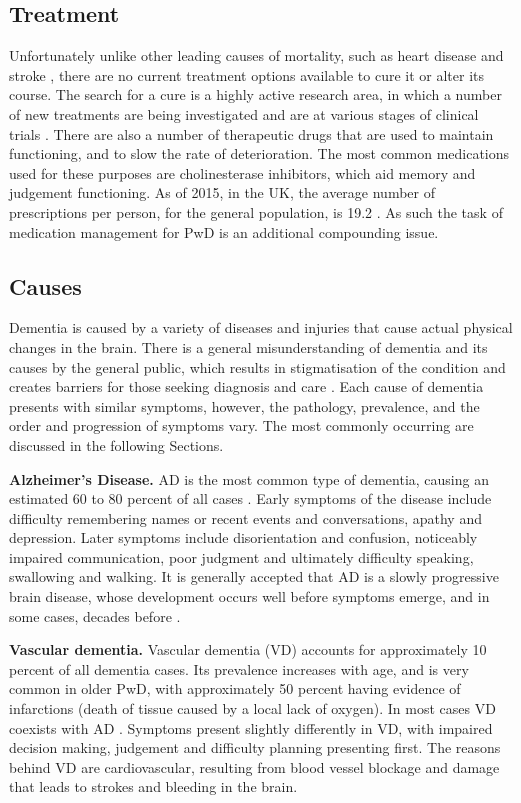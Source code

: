 \subsection{Treatment}
Unfortunately unlike other leading causes of mortality, such as heart disease and stroke \cite{WorldHealthOrganisation2015}, there are no current treatment options available to cure it or alter its course.
The search for a cure is a highly active research area, in which a number of new treatments are being investigated and are at various stages of clinical trials \cite{Burke2015}. There are also a number of therapeutic drugs that are used to maintain functioning, and to slow the rate of deterioration. The most common medications used for these purposes are cholinesterase inhibitors, which aid memory and judgement functioning. As of 2015, in the UK, the average number of prescriptions per person, for the general population, is 19.2 \cite{TheAssociationoftheBritishPharmaceuticalIndustry}. As such the task of medication management for PwD is an additional compounding issue.

\subsection{Causes}
Dementia is caused by a variety of diseases and injuries that cause actual physical changes in the brain. There is a general misunderstanding of dementia and its causes by the general public, which results in stigmatisation of the condition and creates barriers for those seeking diagnosis and care \cite{WHODementia2015}.
Each cause of dementia presents with similar symptoms, however, the pathology, prevalence, and the order and progression of symptoms vary. The most commonly occurring are discussed in the following Sections.

\textbf{Alzheimer's Disease.}
AD is the most common type of dementia, causing an estimated 60 to 80 percent of all cases \cite{2015AlzheimersDiseaseFactsFigures}.
Early symptoms of the disease include difficulty remembering names or recent events and conversations, apathy and depression. Later symptoms include disorientation and confusion, noticeably impaired communication, poor judgment and ultimately difficulty speaking, swallowing and walking.
It is generally accepted that AD is a slowly progressive brain disease, whose development occurs well before symptoms emerge, and in some cases, decades before \cite{DelaTorre2012, 2015AlzheimersDiseaseFactsFigures}.

\textbf{Vascular dementia.}
Vascular dementia (VD) accounts for approximately 10 percent of all dementia cases. Its prevalence increases with age, and is very common in older PwD, with approximately 50 percent having evidence of infarctions (death of tissue caused by a local lack of oxygen). In most cases VD coexists with AD \cite{2015AlzheimersDiseaseFactsFigures}.
Symptoms present slightly differently in VD, with impaired decision making, judgement and difficulty planning presenting first. The reasons behind VD are cardiovascular, resulting from blood vessel blockage and damage that leads to strokes and bleeding in the brain.

